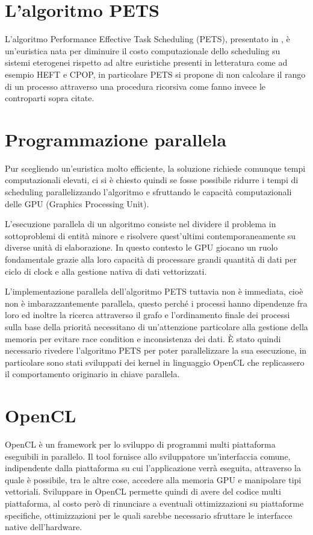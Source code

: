 \section{L'algoritmo PETS}
L'algoritmo Performance Effective Task Scheduling (PETS), presentato in \cite{ilavarasan2007low}, è un'euristica nata per diminuire il costo computazionale dello scheduling su sistemi eterogenei rispetto ad altre euristiche presenti in letteratura come ad esempio HEFT\cite{993206} e CPOP\cite{993206}, in particolare PETS si propone di non calcolare il rango di un processo attraverso una procedura ricorsiva come fanno invece le controparti sopra citate.

\section{Programmazione parallela}
Pur scegliendo un'euristica molto efficiente, la soluzione richiede comunque tempi computazionali elevati, ci si è chiesto quindi se fosse possibile ridurre i tempi di scheduling parallelizzando l'algoritmo e sfruttando le capacità computazionali delle GPU (Graphics Processing Unit).

L'esecuzione parallela di un algoritmo consiste nel dividere il problema in sottoproblemi di entità minore e risolvere quest'ultimi contemporaneamente su diverse unità di elaborazione. In questo contesto le GPU giocano un ruolo fondamentale grazie alla loro capacità di processare grandi quantità di dati per ciclo di clock e alla gestione nativa di dati vettorizzati.

L'implementazione parallela dell'algoritmo PETS tuttavia non è immediata, cioè non è imbarazzantemente parallela, questo perché i processi hanno dipendenze fra loro ed inoltre la ricerca attraverso il grafo e l'ordinamento finale dei processi sulla base della priorità necessitano di un'attenzione particolare alla gestione della memoria per evitare race condition e inconsistenza dei dati.
È stato quindi necessario rivedere l'algoritmo PETS per poter parallelizzare la sua esecuzione, in particolare sono stati sviluppati dei kernel in linguaggio OpenCL che replicassero il comportamento originario in chiave parallela.

\section{OpenCL}
OpenCL\cite{opencl} è un framework per lo sviluppo di programmi multi piattaforma eseguibili in parallelo. Il tool fornisce allo sviluppatore un'interfaccia comune, indipendente dalla piattaforma su cui l'applicazione verrà eseguita, attraverso la quale è possibile, tra le altre cose, accedere alla memoria GPU e manipolare tipi vettoriali.
Sviluppare in OpenCL permette quindi di avere del codice multi piattaforma, al costo però di rinunciare a eventuali ottimizzazioni su piattaforme specifiche, ottimizzazioni per le quali sarebbe necessario sfruttare le interfacce native dell'hardware.



